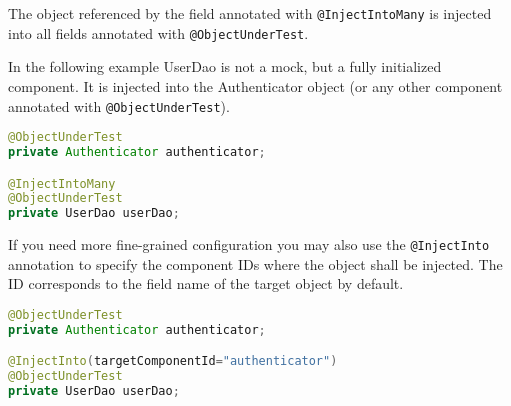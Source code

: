 The object referenced by the field annotated with \verb|@InjectIntoMany| is injected into all fields annotated with \verb|@ObjectUnderTest|.

In the following example UserDao is not a mock, but a fully initialized component. It is injected into the Authenticator object (or any other
component annotated with \verb|@ObjectUnderTest|). 

\begin{lstlisting}[language={JAVA},caption=InjectIntoMany]
@ObjectUnderTest
private Authenticator authenticator;

@InjectIntoMany
@ObjectUnderTest
private UserDao userDao;
\end{lstlisting}

If you need more fine-grained configuration you may also use the \verb|@InjectInto| annotation to specify the component IDs where the object 
shall be injected.
The ID corresponds to the field name of the target object by default.

\begin{lstlisting}[language={JAVA},caption=InjectInto]
@ObjectUnderTest
private Authenticator authenticator;

@InjectInto(targetComponentId="authenticator")
@ObjectUnderTest
private UserDao userDao;
\end{lstlisting}





